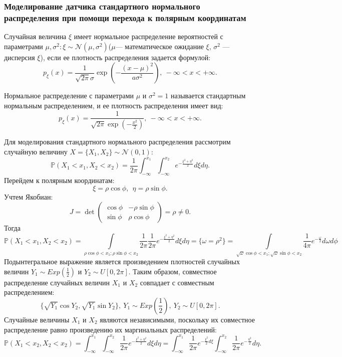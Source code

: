 \documentclass[11pt]{article}
\begin{document}
	\subsubsection{Моделирование датчика стандартного нормального распределения при помощи перехода к полярным координатам}
	\begin{opr}
		Случайная величина $\xi$ имеет нормальное распределение вероятностей  с параметрами $\mu, \sigma^2:\xi \sim \mathcal{N}(\mu,\sigma^2)$($\mu$--- математическое ожидание $\xi$, $\sigma^2$ --- дисперсия $\xi$), если ее плотность распределения задается формулой:
		\[ p_\xi(x)= \frac{1}{\sqrt{2\pi}\sigma}\exp(-\frac{(x - \mu)^2 }{a\sigma^2}), \  -\infty < x < +\infty. \]
	\end{opr}
	\begin{opr}
		Нормальное распределение с параметрами $\mu$ и $\sigma^2 = 1$ называется стандартным нормальным распределением, и ее плотность распределения имеет вид:
		\[ p_\xi(x) = \frac{1}{\sqrt{2\pi}\exp(-\frac{x^2}{2})}, \ -\infty < x < +\infty. \]
	\end{opr}
	Для моделирования стандартного нормального распределения рассмотрим случайную величину $X = \{X_1, X_2\} \sim \mathcal{N}(0,1):$
	\[ \mathbb{P}(X_1 < x_1, X_2 < x_2) = \frac{1}{2\pi}\int_{-\infty}^{x_1}\int_{-\infty}^{x_2}e^{-\frac{\xi^2 + \eta^2}{2}}d\xi d\eta. \]
	Перейдем к полярным координатам:
	\[\xi = \rho \cos \phi, \ \ \eta = \rho \sin \phi. \]
	Учтем Якобиан:
	\[ J = \det \begin{pmatrix}
	\cos \phi & -\rho \sin \phi \\
	\sin \phi & \rho \cos \phi
	\end{pmatrix} = \rho \neq 0. \]
	Тогда 
	\[ \mathbb{P}(X_1 < x_1, X_2 < x_2) = \underset{\rho \cos \phi < x_1 ; \rho \sin \phi < x_2
	}{\int} \frac{1}{2\pi}\frac{1}{2\pi}e^{-\frac{\xi^2 + \eta^2}{2}}d\xi d\eta = \{\omega = \rho^2\} = \underset{\sqrt{\omega} \cos \phi < x_1 ; \sqrt{\omega} \sin \phi < x_2
}{\int} \frac{1}{4\pi}e^{-\frac{\omega}{2}}d\omega d\phi \]	
Подынтегральное выражение является произведением плотностей случайных величин $Y_1 \sim Exp(\frac{1}{2})$ и $Y_2 \sim U[0,2\pi].$ Таким образом, совместное распределение случайных величин $X_1$ и $X_2$ совпадает с совместным распределением:
\[ \{ \sqrt{Y_1}\cos Y_2, \sqrt{Y_1}\sin Y_2 \}, \ Y_1 \sim Exp(\frac{1}{2}), \ Y_2 \sim U[0,2\pi].  \]
Случайные величины $X_1$ и $X_2$ являются независимыми, поскольку их совместное распределение равно произведению их маргинальных распределений:
\[  \mathbb{P}(X_1 < x_2, X_2 < x_2) = \int_{-\infty}^{x_1}\int_{-\infty}^{x_2}\frac{1}{2\pi}e^{-\frac{\xi^2 + \eta^2}{2}}d\xi d\eta = \int_{-\infty}^{x_1}\frac{1}{2\pi} e^{-\frac{\xi^2}{2}d\xi} \int_{-\infty}^{x_2}\frac{1}{2\pi}e^{-\frac{\eta^2}{2}}d\eta. \]
\end{document}
